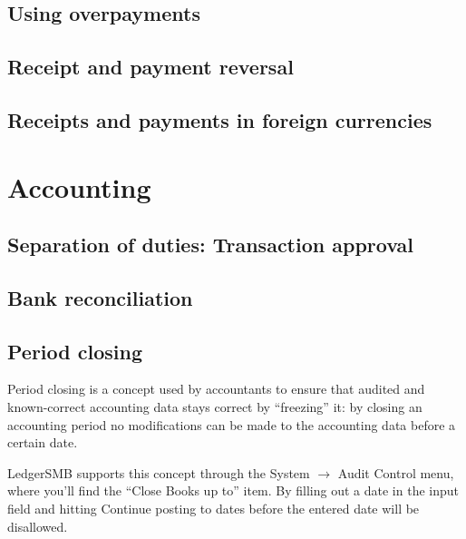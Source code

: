 
\section{Using overpayments}
\label{sec:UsingOverpayments}

\section{Receipt and payment reversal}


\section{Receipts and payments in foreign currencies}

\chapter{Accounting}

\section{Separation of duties: Transaction approval}
\label{sec:SeparationOfDuties}

\section{Bank reconciliation}
\label{sec:Reconciliation}



\section{Period closing}

Period closing is a concept used by accountants to ensure that audited and
known-correct accounting data stays correct by ``freezing'' it: by closing
an accounting period no modifications can be made to the accounting data
before a certain date.

LedgerSMB supports this concept through the System $\rightarrow$ Audit Control
menu, where you'll find the ``Close Books up to'' item. By filling out a date
in the input field and hitting Continue posting to dates before the entered
date will be disallowed.


